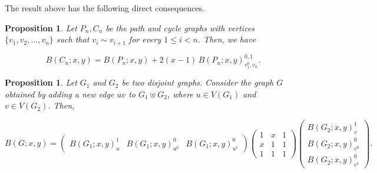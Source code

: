 \documentclass[review]{elsarticle}
\newtheorem{proposition}[theorem]{Proposition}
\begin{document}
The result above has the following direct consequences.

\begin{proposition}\label{p:Cn-Pn}
    Let $P_n,C_n$ be the path and cycle graphs with vertices $\{v_1,v_2,\ldots,v_n\}$ such that $v_i\sim v_{i+1}$ for every $1\leq i<n$. Then, we have 

    \begin{equation}\label{eq:Cn-Pn}
        B(C_n;x,y)=B(P_n;x,y) + 2(x-1) \, B(P_n;x,y)^{0,1}_{v_1^{0},v_n}.
    \end{equation}
\end{proposition}

\begin{proposition}\label{p:G1-G2}
Let $G_1$ and $G_2$ be two disjoint graphs. Consider the graph $G$ obtained by adding a new edge $uv$ to $G_1\uplus G_2$, where $u\in V(G_1)$ and $v\in V(G_2)$. Then, 

\begin{equation}
 B(G;x,y)
 =\displaystyle
 \left(\begin{array}{ccc} B(G_1;x,y)^{1}_{u} & B(G_1;x,y)^{0}_{u^{0}} & B(G_1;x,y)^{0}_{u^{1}} \end{array}\right)
 \left(\begin{array}{ccc} 1 & x & 1 \\ x & 1 & 1 \\ 1 & 1 & 1 \end{array}\right)
 \left(\begin{array}{c} B(G_2;x,y)^{1}_{v} \\ B(G_2;x,y)^{0}_{v^{0}} \\ B(G_2;x,y)^{0}_{v^{1}}\end{array}\right).
\end{equation}

\end{proposition}
\end{document}
